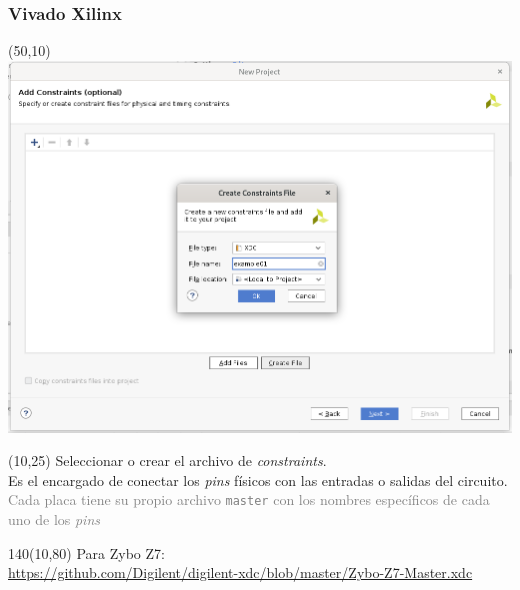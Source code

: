\documentclass[aspectratio=169]{beamer}
\begin{document}
\begin{frame}[fragile,t]
    \frametitle{Vivado Xilinx}
    \begin{textblock}{75}(50,10) \includegraphics[scale=0.27]{img/vivado/07_add_contraints.png} \end{textblock}
    \begin{textblock}{38}(10,25) \small
    Seleccionar o crear el archivo de \emph{constraints}.\\
    \textcolor{verdeuca}{Es el encargado de conectar los \emph{pins} físicos con las entradas o salidas del circuito.}\\
    \textcolor{gray}{Cada placa tiene su propio archivo \texttt{master} con los nombres específicos de cada uno de los \emph{pins}}
    \end{textblock}
    \begin{textblock}{140}(10,80) \small
    Para Zybo Z7:\\
    \url{https://github.com/Digilent/digilent-xdc/blob/master/Zybo-Z7-Master.xdc}
    \end{textblock}
\end{frame}
    
\end{document}

